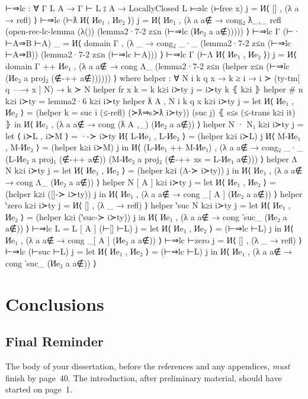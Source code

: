 \documentclass[logo,bsc,singlespacing,parskip,online]{infthesis}
\renewenvironment{code}{\mintedcopy[breaklines,breaksymbolleft=\;]{agda}}{\endmintedcopy}
\begin{document}
\begin{code}
  ⊢⇒lc : ∀ {Γ L A} → Γ ⊢ L ⦂ A → LocallyClosed L
  ⊢⇒lc (⊢free x) j = И⟨ [] , (λ a → refl) ⟩
  ⊢⇒lc (⊢ƛ И⟨ Иe₁ , Иe₂ ⟩) j = И⟨ Иe₁ , (λ a {a∉} → cong₂ ƛ_,_ refl
    (open-rec-lc-lemma
      (λ())
      (lemma2·7-2 z≤n (⊢⇒lc (Иe₂ a {a∉}))))) ⟩
  ⊢⇒lc {Γ} (⊢· ⊢A⇒B ⊢A) _ = И⟨ domain Γ , (λ _ → cong₂ _·_
    (lemma2·7-2 z≤n (⊢⇒lc ⊢A⇒B)) (lemma2·7-2 z≤n (⊢⇒lc ⊢A))) ⟩
  ⊢⇒lc {Γ} (⊢Λ И⟨ Иe₁ , Иe₂ ⟩) j = И⟨ domain Γ ++ Иe₁ , (λ a {a∉} → cong Λ_ (lemma2·7-2 z≤n (helper z≤n (⊢⇒lc (Иe₂ a {proj₂ (∉-++ a∉)}))))) ⟩
    where
      helper : ∀ {N i k q x}
        → k ≥ i
        → i ≻ (ty-tm[ q —→ x ] N)
        → k ≻ N
      helper {fr x} {k = k} k≥i i≻ty j = i≻ty k ⦃ k≥i ⦄
      helper {# n} k≥i i≻ty = lemma2·6 k≥i i≻ty
      helper {ƛ A , N} {i} {k} {q} {x} k≥i i≻ty j =
        let И⟨ Иe₁ , Иe₂ ⟩ = (helper {k = suc i} (≤-refl) (≻ƛ⇒s≻ƛ i≻ty)) (suc j) ⦃ s≤s (≤-trans k≥i it) ⦄
        in И⟨ Иe₁ , (λ a {a∉} → cong (ƛ A ,_) (Иe₂ a {a∉})) ⟩
      helper {N · N₁} k≥i i≻ty j =
        let ⟨ i≻L  , i≻M ⟩ = ·-≻ i≻ty
            И⟨ L-Иe₁ , L-Иe₂ ⟩ = (helper k≥i i≻L) j
            И⟨ M-Иe₁ , M-Иe₂ ⟩ = (helper k≥i i≻M) j
          in И⟨ (L-Иe₁ ++ M-Иe₁) , (λ a {a∉} → cong₂ _·_
            (L-Иe₂ a {proj₁ (∉-++ a∉)})
            (M-Иe₂ a {proj₂ (∉-++ {xs = L-Иe₁} a∉)})) ⟩
      helper {Λ N} k≥i i≻ty j =
        let И⟨ Иe₁ , Иe₂ ⟩ = (helper k≥i (Λ-≻ i≻ty)) j
        in И⟨ Иe₁ , (λ a {a∉} → cong Λ_ (Иe₂ a {a∉})) ⟩
      helper {N [ A ]} k≥i i≻ty j = 
        let И⟨ Иe₁ , Иe₂ ⟩ = (helper k≥i ([]-≻ i≻ty)) j
        in И⟨ Иe₁ , (λ a {a∉} → cong _[ A ] (Иe₂ a {a∉})) ⟩
      helper {‵zero} k≥i i≻ty j = И⟨ [] , (λ _ → refl) ⟩
      helper {‵suc N} k≥i i≻ty j = 
        let И⟨ Иe₁ , Иe₂ ⟩ = (helper k≥i (‵suc-≻ i≻ty)) j
        in И⟨ Иe₁ , (λ a {a∉} → cong ‵suc_ (Иe₂ a {a∉})) ⟩
  ⊢⇒lc {L = L [ A ]} (⊢[] ⊢L) j =
    let И⟨ Иe₁ , Иe₂ ⟩ = (⊢⇒lc ⊢L) j
    in И⟨ Иe₁ , (λ a {a∉} → cong _[ A ]  (Иe₂ a {a∉})) ⟩
  ⊢⇒lc ⊢zero j = И⟨ [] , (λ _ → refl) ⟩
  ⊢⇒lc (⊢suc ⊢L) j =
    let И⟨ Иe₁ , Иe₂ ⟩ = (⊢⇒lc ⊢L) j
    in И⟨ Иe₁ , (λ a {a∉} → cong ‵suc_ (Иe₂ a {a∉})) ⟩
\end{code}
\chapter{Conclusions}

\section{Final Reminder}

The body of your dissertation, before the references and any appendices,
\emph{must} finish by page~40. The introduction, after preliminary material,
should have started on page~1.
\end{document}
